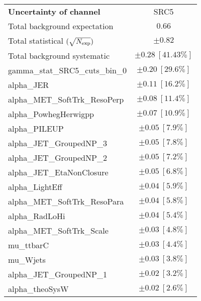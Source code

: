 
\begin{table}
\begin{center}
\setlength{\tabcolsep}{0.0pc}
\begin{tabular*}{\textwidth}{@{\extracolsep{\fill}}lc}
\noalign{\smallskip}\hline\noalign{\smallskip}
{\bf Uncertainty of channel}                                    & SRC5            \\
\noalign{\smallskip}\hline\noalign{\smallskip}
Total background expectation             &  $0.66$       \\
\noalign{\smallskip}\hline\noalign{\smallskip}
Total statistical $(\sqrt{N_{\rm exp}})$              & $\pm 0.82$       \\
Total background systematic               & $\pm 0.28\ [41.43\%] $             \\
\noalign{\smallskip}\hline\noalign{\smallskip}
\noalign{\smallskip}\hline\noalign{\smallskip}
gamma\_stat\_SRC5\_cuts\_bin\_0         & $\pm 0.20\ [29.6\%] $       \\
alpha\_JER         & $\pm 0.11\ [16.2\%] $       \\
alpha\_MET\_SoftTrk\_ResoPerp         & $\pm 0.08\ [11.4\%] $       \\
alpha\_PowhegHerwigpp         & $\pm 0.07\ [10.9\%] $       \\
alpha\_PILEUP         & $\pm 0.05\ [7.9\%] $       \\
alpha\_JET\_GroupedNP\_3         & $\pm 0.05\ [7.8\%] $       \\
alpha\_JET\_GroupedNP\_2         & $\pm 0.05\ [7.2\%] $       \\
alpha\_JET\_EtaNonClosure         & $\pm 0.05\ [6.8\%] $       \\
alpha\_LightEff         & $\pm 0.04\ [5.9\%] $       \\
alpha\_MET\_SoftTrk\_ResoPara         & $\pm 0.04\ [5.8\%] $       \\
alpha\_RadLoHi         & $\pm 0.04\ [5.4\%] $       \\
alpha\_MET\_SoftTrk\_Scale         & $\pm 0.03\ [4.8\%] $       \\
mu\_ttbarC         & $\pm 0.03\ [4.4\%] $       \\
mu\_Wjets         & $\pm 0.03\ [3.8\%] $       \\
alpha\_JET\_GroupedNP\_1         & $\pm 0.02\ [3.2\%] $       \\
alpha\_theoSysW         & $\pm 0.02\ [2.6\%] $       \\

\end{tabular*}
\end{center}
\end{table}
